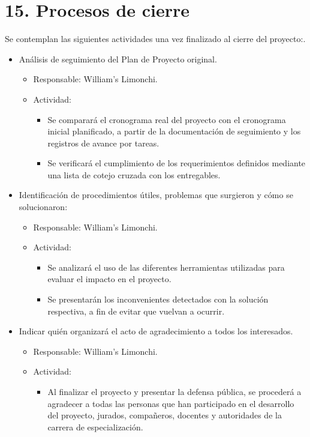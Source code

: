 \documentclass[
11pt, %
]{charter}
\begin{document}
\section{15. Procesos de cierre}    
\label{sec:cierre}

Se contemplan las siguientes actividades una vez finalizado al cierre del proyecto:.

\begin{itemize}
	\item Análisis de seguimiento del Plan de Proyecto original.
	\begin{itemize}
		\item Responsable: William’s Limonchi.
		\item Actividad: 
		\begin{itemize}
			\item Se comparará el cronograma real del proyecto con el cronograma inicial planificado, a partir de la documentación de seguimiento y los registros de avance por tareas.
			\item Se verificará el cumplimiento de los requerimientos definidos mediante una lista de cotejo cruzada con los entregables.
		\end{itemize}
	\end{itemize}
	\item Identificación de procedimientos útiles, problemas que surgieron y cómo se solucionaron:
	\begin{itemize}
		\item Responsable: William’s Limonchi.
		\item Actividad: 
		\begin{itemize}
			\item Se analizará el uso de las diferentes herramientas utilizadas para evaluar el
			impacto en el proyecto.
			\item Se presentarán los inconvenientes detectados con la solución respectiva, a fin de evitar que vuelvan a ocurrir.
		\end{itemize}
	\end{itemize}
	\item Indicar quién organizará el acto de agradecimiento a todos los interesados.
	\begin{itemize}
		\item Responsable: William’s Limonchi.
		\item Actividad: 
		\begin{itemize}
			\item Al finalizar el proyecto y presentar la defensa pública, se procederá a agradecer
			a todas las personas que han participado en el desarrollo del proyecto, jurados,
			compañeros, docentes y autoridades de la carrera de especialización.
		\end{itemize}
	\end{itemize}
\end{itemize}
\end{document}
